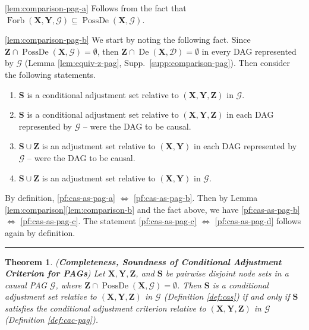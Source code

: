 \documentclass[twoside]{article}
\newtheorem{theorem}{Theorem}
\DeclareMathOperator{\De}{De}
\DeclareMathOperator{\PossDe}{PossDe}
\DeclareMathOperator{\Forb}{Forb}
\newcommand{\fb}[2][X,Y]{\Forb(\mb{#1},#2)}
\newcommand{\mb}[1]{\mathbf{#1}}
\newcommand{\g}[1][G]{\mathcal{#1}}
\newenvironment{proofof}[1][]{\begin{trivlist}
\item[\hskip \labelsep {\bfseries Proof of #1.}]}{\hfill\BlackBox\end{trivlist}}
\newcommand{\BlackBox}{\rule{1.5ex}{1.5ex}}
\begin{document}
\begin{proofof}[Lemma \ref{lem:comparison-pag}] 
    \ref{lem:comparison-pag-a} Follows from the fact that $\fb{\g} \subseteq \PossDe(\mb{X}, \g)$. 

    \ref{lem:comparison-pag-b} We start by noting the following fact. Since $\mb{Z} \cap \PossDe(\mb{X}, \g) = \emptyset$, then $\mb{Z} \cap \De(\mb{X},\g[D]) = \emptyset$ in every DAG represented by $\g$ (Lemma \ref{lem:equiv-z-pag}, Supp.\ \ref{supp:comparison-pag}).
    Then consider the following statements.
    \begin{enumerate}[label=(\alph*)]
    	\item $\mb{S}$ is a conditional adjustment set relative to $(\mb{X},\mb{Y},\mb{Z})$ in $\g$. \label{pf:cas-as-pag-a}
    
     	\item $\mb{S}$ is a conditional adjustment set relative to $(\mb{X},\mb{Y},\mb{Z})$ in each DAG represented by $\g$ -- were the DAG to be causal.\label{pf:cas-as-pag-b}
    
      	\item $\mb{S} \cup \mb{Z}$ is an adjustment set relative to $(\mb{X},\mb{Y})$ in each DAG represented by $\g$ -- were the DAG to be causal. \label{pf:cas-as-pag-c}
    
      	\item $\mb{S} \cup \mb{Z}$ is an adjustment set relative to $(\mb{X},\mb{Y})$ in $\g$. \label{pf:cas-as-pag-d}
    \end{enumerate}

    By definition, \ref{pf:cas-as-pag-a} $\Leftrightarrow$ \ref{pf:cas-as-pag-b}. Then by Lemma \ref{lem:comparison}\ref{lem:comparison-b} and the fact above, we have \ref{pf:cas-as-pag-b} $\Leftrightarrow$ \ref{pf:cas-as-pag-c}. The statement \ref{pf:cas-as-pag-c} $\Leftrightarrow$ \ref{pf:cas-as-pag-d} follows again by definition.
\end{proofof}




\begin{theorem}
\label{thm:cac-cas-pag}
{\normalfont (\textbf{Completeness, Soundness of Conditional Adjustment Criterion for PAGs})}
    Let $\mb{X,Y}, \mb{Z}$, and $\mb{S}$ be pairwise disjoint node sets in a causal PAG $\g$, where $\mb{Z} \cap \PossDe(\mb{X},\g) = \emptyset$. Then $\mb{S}$ is a conditional adjustment set relative to $(\mb{X,Y,Z})$ in $\g$ (Definition \ref{def:cas}) if and only if $\mb{S}$ satisfies the conditional adjustment criterion relative to $(\mb{X,Y,Z})$ in $\g$ (Definition \ref{def:cac-pag}).
\end{theorem}
\end{document}
